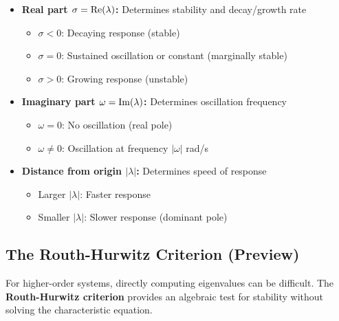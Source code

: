 \begin{itemize}
    \item \textbf{Real part $\sigma = \operatorname{Re}(\lambda)$:} Determines stability and decay/growth rate
    \begin{itemize}
        \item $\sigma < 0$: Decaying response (stable)
        \item $\sigma = 0$: Sustained oscillation or constant (marginally stable)
        \item $\sigma > 0$: Growing response (unstable)
    \end{itemize}

    \item \textbf{Imaginary part $\omega = \operatorname{Im}(\lambda)$:} Determines oscillation frequency
    \begin{itemize}
        \item $\omega = 0$: No oscillation (real pole)
        \item $\omega \neq 0$: Oscillation at frequency $|\omega|$ rad/s
    \end{itemize}

    \item \textbf{Distance from origin $|\lambda|$:} Determines speed of response
    \begin{itemize}
        \item Larger $|\lambda|$: Faster response
        \item Smaller $|\lambda|$: Slower response (dominant pole)
    \end{itemize}
\end{itemize}



\subsection{The Routh-Hurwitz Criterion (Preview)}

For higher-order systems, directly computing eigenvalues can be difficult. The \textbf{Routh-Hurwitz criterion} provides an algebraic test for stability without solving the characteristic equation.


